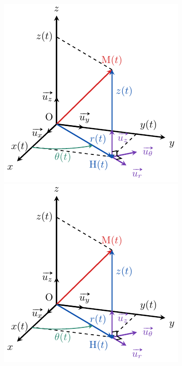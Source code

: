 \documentclass[a4paper, 10pt, final, garamond]{book}
\begin{document}
\begin{enumerate}[label=\sqenumi]
\begin{minipage}[t]{.20\linewidth}
\begin{center}
{				      \includegraphics[width=\linewidth, draft=true]{pos_cyl_prof}
			      }{
				      \includegraphics[width=\linewidth]{pos_cyl_prof}
}
\end{center}
\end{minipage}
\end{enumerate}
\end{document}
